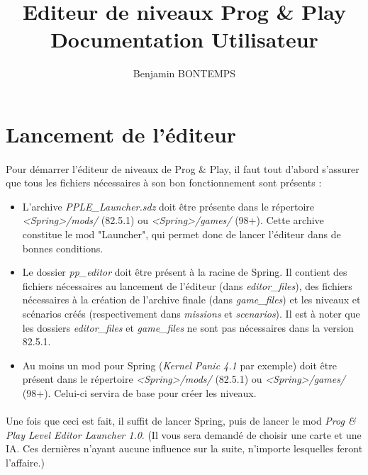 \documentclass[a4paper]{article}
\title{Editeur de niveaux Prog \& Play\\ Documentation Utilisateur}
\author{Benjamin BONTEMPS}
\begin{document}
\maketitle

\tableofcontents

\newpage

\section{Lancement de l'éditeur}
\paragraph{ }
Pour démarrer l'éditeur de niveaux de Prog \& Play, il faut tout d'abord s'assurer que tous les fichiers nécessaires à son bon fonctionnement sont présents :
\begin{itemize}
\item L'archive \textit{PPLE\_Launcher.sdz} doit être présente dans le répertoire \textit{<Spring>/mods/} (82.5.1) ou \textit{<Spring>/games/} (98+). Cette archive constitue le mod "Launcher", qui permet donc de lancer l'éditeur dans de bonnes conditions.
\item Le dossier \textit{pp\_editor} doit être présent à la racine de Spring. Il contient des fichiers nécessaires au lancement de l'éditeur (dans \textit{editor\_files}), des fichiers nécessaires à la création de l'archive finale (dans \textit{game\_files}) et les niveaux et scénarios créés (respectivement dans \textit{missions} et \textit{scenarios}). Il est à noter que les dossiers \textit{editor\_files} et \textit{game\_files} ne sont pas nécessaires dans la version 82.5.1.
\item Au moins un mod pour Spring (\textit{Kernel Panic 4.1} par exemple) doit être présent dans le répertoire \textit{<Spring>/mods/} (82.5.1) ou \textit{<Spring>/games/} (98+). Celui-ci servira de base pour créer les niveaux.
\end{itemize}
\paragraph{ }
Une fois que ceci est fait, il suffit de lancer Spring, puis de lancer le mod \textit{Prog \& Play Level Editor Launcher 1.0}. (Il vous sera demandé de choisir une carte et une IA. Ces dernières n'ayant aucune influence sur la suite, n'importe lesquelles feront l'affaire.)
\end{document}
